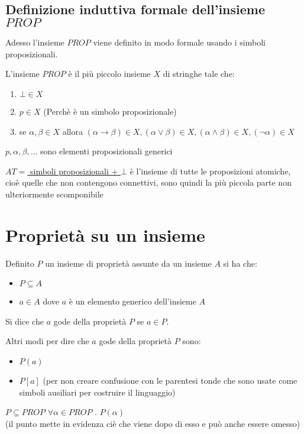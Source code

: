 \documentclass{article}
\theoremstyle{break}
\theoremstyle{break}
\theoremstyle{break}
\theoremstyle{break}
\begin{document}
\subsection{Definizione induttiva formale dell'insieme \texorpdfstring{\( PROP \)}{PROP}}
Adesso l'insieme \( PROP \) viene definito in modo formale usando i simboli proposizionali.
\begin{definition}
  L'insieme \( PROP \) è il più piccolo insieme \( X \) di stringhe tale che:
  \begin{enumerate}
    \item \( \bot \in X \)
    \item \( p \in X \) (Perchè è un simbolo proposizionale)
    \item se \( \alpha, \beta \in X \) allora \( (\alpha \to \beta ) \in X, (\alpha \vee \beta ) \in X,
      (\alpha \wedge \beta ) \in X, (\neg \alpha ) \in X \)
  \end{enumerate}
  \( p, \alpha , \beta, \ldots  \) sono elementi proposizionali generici
\end{definition}
\underline{\( AT  = \) simboli proposizionali + \( \bot \)}
è l'insieme di tutte le proposizioni atomiche,
cioè quelle che non contengono connettivi, sono quindi la più piccola parte
non ulteriormente scomponibile

\section{Proprietà su un insieme}
Definito \( P \) un insieme di proprietà assunte da un insieme \( A \) si ha che:
\begin{itemize}
  \item \( P \subseteq A \)
  \item \( a \in A \) dove \( a \) è un elemento generico dell'insieme \( A \)
\end{itemize}
Si dice che \( a \) gode della proprietà \( P \) se \( a \in P \).

Altri modi per dire che \( a \) gode della proprietà \( P \) sono:
\begin{itemize}
  \item \( P(a) \)
  \item \( P[a] \) (per non creare confusione con le parentesi tonde che sono
    usate come simboli ausiliari per costruire il linguaggio)
\end{itemize}

\( P \subseteq PROP \)\hspace{5mm} \( \forall \alpha \in PROP \) \( . \) \( P(\alpha ) \)\\
(il punto mette in evidenza ciè che viene dopo di esso e può anche essere omesso)
\end{document}
